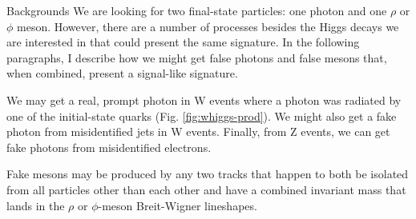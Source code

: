 \begin{section}{Backgrounds}\label{backgrounds}
We are looking for two final-state particles: one photon and one $\rho$ or $\phi$ meson. However, there are a number of processes besides the Higgs decays we are interested in that could present the same signature. In the following paragraphs, I describe how we might get false photons and false mesons that, when combined, present a signal-like signature.

We may get a real, prompt photon in W events where a photon was radiated by one of the initial-state quarks (Fig. \ref{fig:whiggs-prod}). We might also get a fake photon from misidentified jets in W events. Finally, from Z events, we can get fake photons from misidentified electrons.

Fake mesons may be produced by any two tracks that happen to both be isolated from all particles other than each other and have a combined invariant mass that lands in the $\rho$ or $\phi$-meson Breit-Wigner lineshapes.
\end{section}

